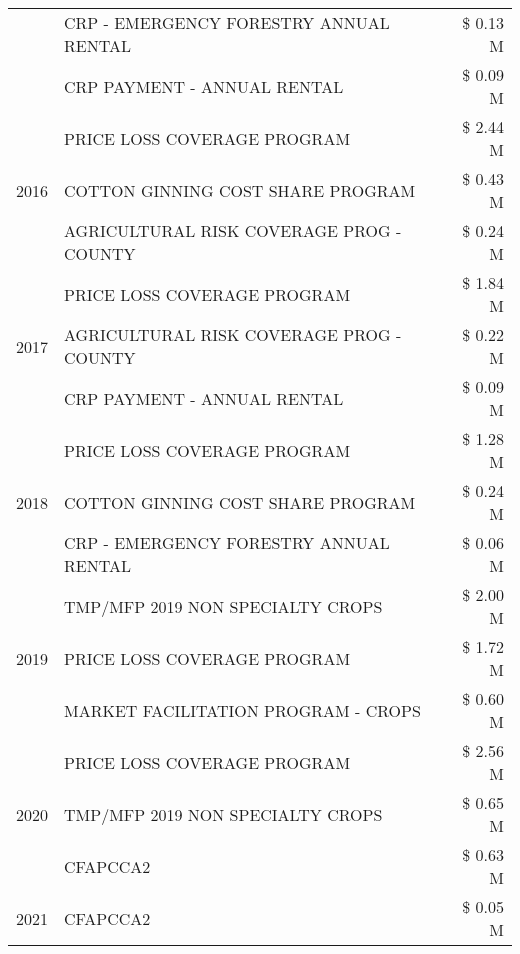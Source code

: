 \begin{tabular}{llr}
 & CRP - EMERGENCY FORESTRY ANNUAL RENTAL & \$ 0.13 M \\
 & CRP PAYMENT - ANNUAL RENTAL & \$ 0.09 M \\
\cline{1-3}
\multirow[t]{3}{*}{2016} & PRICE LOSS COVERAGE PROGRAM                   & \$ 2.44 M \\
 & COTTON GINNING COST SHARE PROGRAM             & \$ 0.43 M \\
 & AGRICULTURAL RISK COVERAGE PROG - COUNTY      & \$ 0.24 M \\
\cline{1-3}
\multirow[t]{3}{*}{2017} & PRICE LOSS COVERAGE PROGRAM & \$ 1.84 M \\
 & AGRICULTURAL RISK COVERAGE PROG - COUNTY & \$ 0.22 M \\
 & CRP PAYMENT - ANNUAL RENTAL & \$ 0.09 M \\
\cline{1-3}
\multirow[t]{3}{*}{2018} & PRICE LOSS COVERAGE PROGRAM & \$ 1.28 M \\
 & COTTON GINNING COST SHARE PROGRAM & \$ 0.24 M \\
 & CRP - EMERGENCY FORESTRY ANNUAL RENTAL & \$ 0.06 M \\
\cline{1-3}
\multirow[t]{3}{*}{2019} & TMP/MFP 2019 NON SPECIALTY CROPS & \$ 2.00 M \\
 & PRICE LOSS COVERAGE PROGRAM & \$ 1.72 M \\
 & MARKET FACILITATION PROGRAM - CROPS & \$ 0.60 M \\
\cline{1-3}
\multirow[t]{3}{*}{2020} & PRICE LOSS COVERAGE PROGRAM & \$ 2.56 M \\
 & TMP/MFP 2019 NON SPECIALTY CROPS & \$ 0.65 M \\
 & CFAPCCA2 & \$ 0.63 M \\
\cline{1-3}
2021 & CFAPCCA2 & \$ 0.05 M \\
\cline{1-3}
\bottomrule
\end{tabular}
